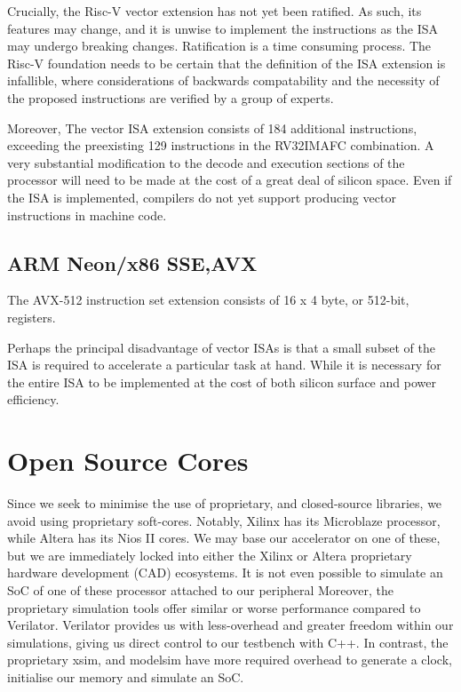 \documentclass[a4paper,8pt]{report}
\begin{document}
Crucially, the Risc-V vector extension has not yet been ratified. As such, its
features may change, and it is unwise to implement the instructions as the ISA
may undergo breaking changes. Ratification is a time consuming process. The
Risc-V foundation needs to be certain that the definition of the ISA extension
is infallible, where considerations of backwards compatability and the necessity of
the proposed instructions are verified by a group of experts.

Moreover, The vector ISA extension consists of 184
additional instructions, exceeding the preexisting 129 instructions in the
RV32IMAFC combination. A very substantial modification to the decode and
execution sections of the processor will need to be made at the cost of a great
deal of silicon space. Even if the ISA is implemented, compilers do not yet
support producing vector instructions in machine code.


\subsection{ARM Neon/x86 SSE,AVX}
The AVX-512 instruction set extension consists of 16 x 4 byte, or 512-bit,
registers. 

Perhaps the principal disadvantage of vector ISAs is that a small subset of the
ISA is required to accelerate a particular task at hand. While it is necessary
for the entire ISA to be implemented at the cost of both silicon surface and
power efficiency.





\section{Open Source Cores}
Since we seek to minimise the use of proprietary, and closed-source libraries,
we avoid using proprietary soft-cores. Notably, Xilinx has its Microblaze
processor, while Altera has its Nios II cores. We may base our accelerator on
one of these, but we are immediately locked into either the Xilinx or Altera
proprietary hardware development (CAD) ecosystems. It is not even possible to
simulate an SoC of one of these processor attached to our peripheral
Moreover, the proprietary simulation tools offer similar or worse performance
compared to Verilator. Verilator provides us with less-overhead and greater
freedom within our simulations, giving us direct control to our testbench with
C++. In contrast, the proprietary xsim, and modelsim have more required overhead
to generate a clock, initialise our memory and simulate an SoC.
\end{document}
